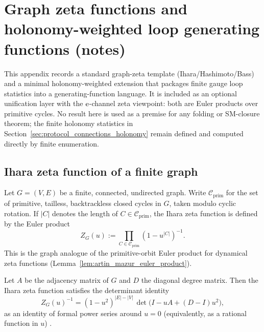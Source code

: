 \section{Graph zeta functions and holonomy-weighted loop generating functions (notes)}
\label{app:graph_zeta_holonomy}

\AuditTag This appendix records a standard graph-zeta template (Ihara/Hashimoto/Bass) and a minimal holonomy-weighted extension that packages finite gauge loop statistics into a generating-function language.
It is included as an optional unification layer with the $\mathrm{e}$-channel zeta viewpoint: both are Euler products over primitive cycles.
No result here is used as a premise for any folding or SM-closure theorem; the finite holonomy statistics in Section~\ref{sec:protocol_connections_holonomy} remain defined and computed directly by finite enumeration.

\subsection{Ihara zeta function of a finite graph}
\label{subsec:ihara_zeta_definition}

Let $G=(V,E)$ be a finite, connected, undirected graph.
Write $\mathcal{C}_{\mathrm{prim}}$ for the set of primitive, tailless, backtrackless closed cycles in $G$, taken modulo cyclic rotation.
If $|C|$ denotes the length of $C\in\mathcal{C}_{\mathrm{prim}}$, the Ihara zeta function is defined by the Euler product
\begin{equation}
\label{eq:ihara_zeta_euler_product}
Z_G(u):=\prod_{C\in\mathcal{C}_{\mathrm{prim}}}\left(1-u^{|C|}\right)^{-1}.
\end{equation}
This is the graph analogue of the primitive-orbit Euler product for dynamical zeta functions (Lemma~\ref{lem:artin_mazur_euler_product}).

\begin{theorem}
\label{thm:bass_determinant_formula}
\MathTag Let $A$ be the adjacency matrix of $G$ and $D$ the diagonal degree matrix.
Then the Ihara zeta function satisfies the determinant identity
\[
Z_G(u)^{-1}=(1-u^2)^{|E|-|V|}\,\det\!\bigl(I-uA+(D-I)u^2\bigr),
\]
as an identity of formal power series around $u=0$ (equivalently, as a rational function in $u$) \cite{Bass1992,Terras2010}.
\end{theorem}

